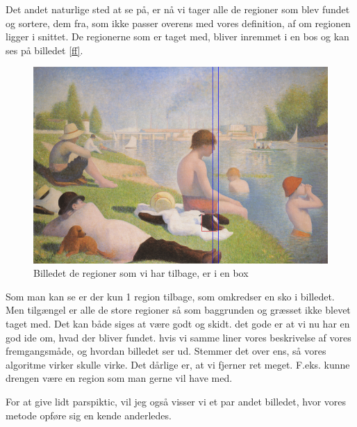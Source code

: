 Det andet naturlige sted at se på, er nå vi tager alle de regioner som
blev fundet og sortere, dem fra, som ikke passer overens med vores
definition, af om regionen ligger i snittet. De regionerne som er taget
med, bliver inremmet i en bos og kan ses på billedet \ref{ff}. 

\begin{figure}[h!!]
	\begin{center}
		\includegraphics[scale=0.42,angle=0]{afsnit/afprovning/billeder/boindingboxbilledet.png}
	\end{center}
	\caption[]{Billedet de regioner som vi har tilbage, er i en box}
	\label{blob}
\end{figure}

Som man kan se er der kun 1 region tilbage, som omkredser en sko i
billedet. Men tilgængel er alle de store regioner så som baggrunden og
græsset ikke blevet taget med. Det kan både siges at være godt og skidt.
det gode er at vi nu har en god ide om, hvad der bliver fundet. hvis vi
samme liner vores beskrivelse af vores fremgangsmåde, og hvordan
billedet ser ud. Stemmer det over ens, så vores algoritme virker skulle virke. Det
dårlige er, at vi fjerner ret meget. F.eks. kunne drengen være en
region som man gerne vil have med.

For at give lidt parspiktic, vil jeg også visser vi et par andet billedet, hvor
vores metode opføre sig en kende anderledes.
	
